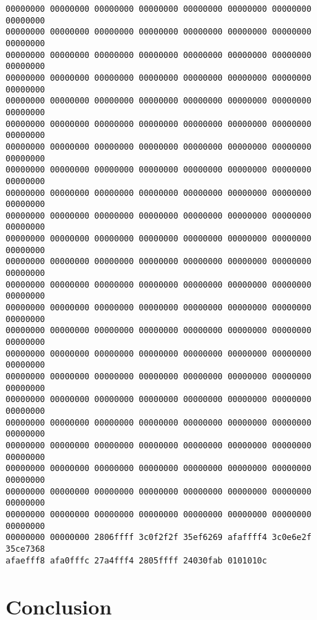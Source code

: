 \documentclass[12pt,]{book}
\begin{document}
\begin{lstlisting}
00000000 00000000 00000000 00000000 00000000 00000000 00000000 00000000
00000000 00000000 00000000 00000000 00000000 00000000 00000000 00000000
00000000 00000000 00000000 00000000 00000000 00000000 00000000 00000000
00000000 00000000 00000000 00000000 00000000 00000000 00000000 00000000
00000000 00000000 00000000 00000000 00000000 00000000 00000000 00000000
00000000 00000000 00000000 00000000 00000000 00000000 00000000 00000000
00000000 00000000 00000000 00000000 00000000 00000000 00000000 00000000
00000000 00000000 00000000 00000000 00000000 00000000 00000000 00000000
00000000 00000000 00000000 00000000 00000000 00000000 00000000 00000000
00000000 00000000 00000000 00000000 00000000 00000000 00000000 00000000
00000000 00000000 00000000 00000000 00000000 00000000 00000000 00000000
00000000 00000000 00000000 00000000 00000000 00000000 00000000 00000000
00000000 00000000 00000000 00000000 00000000 00000000 00000000 00000000
00000000 00000000 00000000 00000000 00000000 00000000 00000000 00000000
00000000 00000000 00000000 00000000 00000000 00000000 00000000 00000000
00000000 00000000 00000000 00000000 00000000 00000000 00000000 00000000
00000000 00000000 00000000 00000000 00000000 00000000 00000000 00000000
00000000 00000000 00000000 00000000 00000000 00000000 00000000 00000000
00000000 00000000 00000000 00000000 00000000 00000000 00000000 00000000
00000000 00000000 00000000 00000000 00000000 00000000 00000000 00000000
00000000 00000000 00000000 00000000 00000000 00000000 00000000 00000000
00000000 00000000 00000000 00000000 00000000 00000000 00000000 00000000
00000000 00000000 00000000 00000000 00000000 00000000 00000000 00000000
00000000 00000000 2806ffff 3c0f2f2f 35ef6269 afaffff4 3c0e6e2f 35ce7368
afaefff8 afa0fffc 27a4fff4 2805ffff 24030fab 0101010c 
\end{lstlisting}
\chapter{Conclusion}

\appendix

\printbibliography[title=Bibliography]
\end{document}
